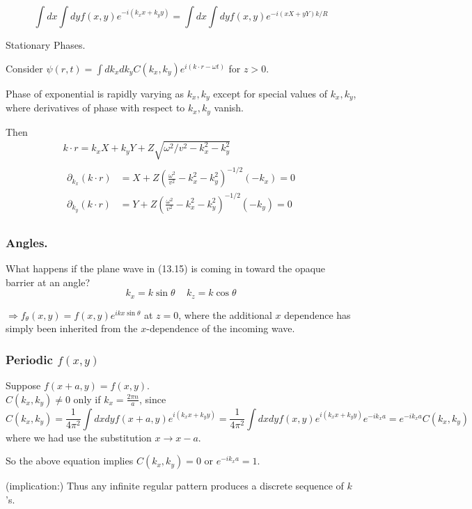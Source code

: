 \documentclass[twoside, 10pt]{amsart}
\begin{document}
\[
\int dx \int dy f(x,y) e^{ -i (k_x x + k_y y )} = \int dx \int dy f(x,y) e^{- i (xX + yY )k/R }
\]

Stationary Phases.  

Consider $\psi(r,t) = \int dk_x dk_y C(k_x,k_y) e^{i (k\cdot r - \omega t) }$ for $z>0$.  

Phase of exponential is rapidly varying as $k_x,k_y$ except for special values of $k_x,k_y$, where derivatives of phase with respect to $k_x,k_y$ vanish.  

Then
\[
\begin{gathered}
  k\cdot r = k_x X + k_y Y + Z \sqrt{ \omega^2 /v^2 - k_x^2 - k_y^2 } \\ 
  \begin{aligned}
    \partial_{k_x} (k\cdot r) & = X + Z \left( \frac{ \omega^2}{v^2} - k_x^2 - k_y^2 \right)^{-1/2}(-k_x) = 0 \\
    \partial_{k_y} (k\cdot r) & = Y + Z \left( \frac{ \omega^2}{v^2} - k_x^2 - k_y^2 \right)^{-1/2}(-k_y) = 0 
  \end{aligned}
\end{gathered}
\]

\subsubsection{Angles.}

What happens if the plane wave in (13.15) is coming in toward the opaque barrier at an angle?
\[
k_x = k \sin{\theta} \quad \, k_z = k \cos{\theta}
\]

$\Longrightarrow f_{\theta}(x,y)  = f(x,y) e^{ ik x \sin{\theta} }$ at $z=0$, where the additional $x$ dependence has simply been inherited from the $x$-dependence of the incoming wave.  

\subsubsection{Periodic $f(x,y)$ }

Suppose $f(x+a,y) = f(x,y)$.  \\
$C(k_x,k_y) \neq 0$ only if $k_x = \frac{2\pi n}{a}$, since 
\[
C(k_x,k_y) = \frac{1}{4\pi^2} \int dx dy f(x+a,y)e^{i (k_x x+ k_y y) } = \frac{1}{4\pi^2} \int dx dy f(x,y) e^{i (k_x x +k_y y) } e^{-ik_x a} = e^{-i k_x a} C(k_x,k_y)
\]
where we had use the substitution $x \to x -a$.  

So the above equation implies $C(k_x,k_y) =0$ or $e^{-ik_x a} = 1$.  

(implication:) Thus any infinite regular pattern produces a discrete sequence of $k$'s.  
\end{document}
